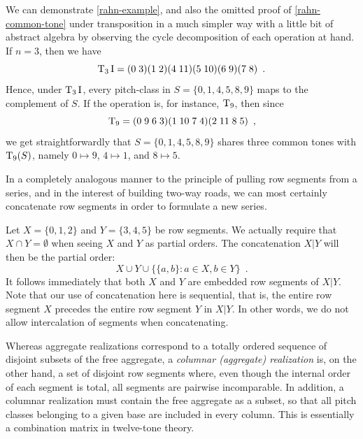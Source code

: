 \begin{example}
	We can demonstrate \ref{rahn-example}, and also the omitted proof of \ref{rahn-common-tone} under transposition in a much simpler way with a little bit of abstract algebra by observing the cycle decomposition of each operation at hand. If $n = 3$, then we have
	\begin{equation}
		\operatorname{T}_3\operatorname{I} = (0 \; 3) (1 \; 2) (4 \; 11) (5 \; 10) (6 \; 9) (7 \; 8) \enspace.
	\end{equation}
	Hence, under $\operatorname{T}_3\operatorname{I}$, every pitch-class in $S = \{ 0, 1, 4, 5, 8, 9 \}$ maps to the complement of $S$. If the operation is, for instance, $\operatorname{T}_9$, then since
	\begin{equation}
		\operatorname{T}_9 = (0 \; 9 \; 6 \; 3) (1 \; 10 \; 7 \; 4) (2 \; 11 \; 8 \; 5) \enspace,
	\end{equation}
	we get straightforwardly that $S = \{ 0, 1, 4, 5, 8, 9 \}$ shares three common tones with $\operatorname{T}_9(S)$, namely $0 \mapsto 9$, $4 \mapsto 1$, and $8 \mapsto 5$.
\end{example}

In a completely analogous manner to the principle of pulling row segments from a series, and in the interest of building two-way roads, we can most certainly concatenate row segments in order to formulate a new series. 

\begin{example}
    \cite[200]{Starr1984}
    Let $X = \{ 0, 1, 2 \}$ and $Y = \{ 3, 4, 5 \}$ be row segments. We actually require that $X \cap Y = \emptyset$ when seeing $X$ and $Y$ as partial orders. The concatenation $X | Y$ will then be the partial order:
    \begin{equation}
        X \cup Y \cup \{ \{ a, b \} : a \in X, b \in Y \} \enspace.
    \end{equation}
    It follows immediately that both $X$ and $Y$ are embedded row segments of $X | Y$. Note that our use of concatenation here is sequential, that is, the entire row segment $X$ precedes the entire row segment $Y$ in $X | Y$. In other words, we do not allow intercalation of segments when concatenating.
\end{example}

Whereas aggregate realizations correspond to a totally ordered sequence of disjoint subsets of the free aggregate, a \emph{columnar (aggregate) realization} is, on the other hand, a set of disjoint row segments where, even though the internal order of each segment is total, all segments are pairwise incomparable. In addition, a columnar realization must contain the free aggregate as a subset, so that all pitch classes belonging to a given base are included in every column. This is essentially a combination matrix in twelve-tone theory.

